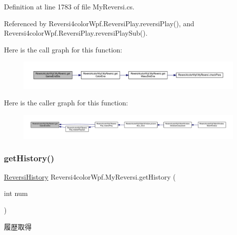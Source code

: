 Definition at line 1783 of file My\+Reversi.\+cs.



Referenced by Reversi4color\+Wpf.\+Reversi\+Play.\+reversi\+Play(), and Reversi4color\+Wpf.\+Reversi\+Play.\+reversi\+Play\+Sub().

Here is the call graph for this function\+:
\nopagebreak
\begin{figure}[H]
\begin{center}
\leavevmode
\includegraphics[width=350pt]{class_reversi4color_wpf_1_1_my_reversi_a0aa1a90ea5faa1685b89617a50a6a2e1_cgraph}
\end{center}
\end{figure}
Here is the caller graph for this function\+:
\nopagebreak
\begin{figure}[H]
\begin{center}
\leavevmode
\includegraphics[width=350pt]{class_reversi4color_wpf_1_1_my_reversi_a0aa1a90ea5faa1685b89617a50a6a2e1_icgraph}
\end{center}
\end{figure}
\mbox{\label{class_reversi4color_wpf_1_1_my_reversi_a2e7355e057594ba70b777cf179a94d41}} 
\subsubsection{\texorpdfstring{get\+History()}{getHistory()}}
{\footnotesize\ttfamily \hyperlink{class_reversi4color_wpf_1_1_reversi_history}{Reversi\+History} Reversi4color\+Wpf.\+My\+Reversi.\+get\+History (\begin{DoxyParamCaption}\item[{int}]{num }\end{DoxyParamCaption})}



履歴取得 



